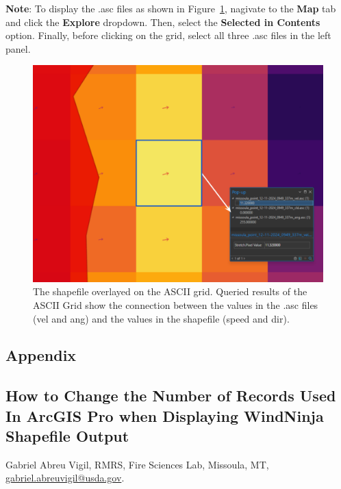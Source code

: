 \documentclass[12pt]{article}
\begin{document}
\textbf{Note}: To display the .asc files as shown in Figure~\ref{fig:Figure15}, nagivate to the \textbf{Map} tab and click the \textbf{Explore} dropdown. Then, select the \textbf{Selected in Contents} option. Finally, before clicking on the grid, select all three .asc files in the left panel. 

\begin{figure}[H]
	\centering
	\includegraphics[scale=0.4]{arc_15.png}
	\caption{The shapefile overlayed on the ASCII grid. Queried results of the ASCII Grid show the connection between the values in the .asc files (vel and ang) and the values in the shapefile (speed and dir). }
\label{fig:Figure15}
\end{figure}


\renewcommand{\thefigure}{\arabic{figure}}
\setcounter{figure}{0}

\pagebreak
\begin{centering}
\section*{Appendix}
\label{section:appendix}

\subsection*{How to Change the Number of Records Used In ArcGIS Pro when Displaying WindNinja Shapefile Output}
Gabriel Abreu Vigil, RMRS, Fire Sciences Lab, Missoula, MT, \href{mailto:gabriel.abreuvigil@usda.gov}{gabriel.abreuvigil@usda.gov}.
\end{centering}
\end{document}
